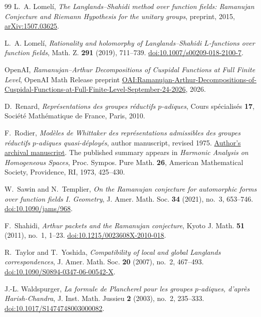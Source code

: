 \begin{thebibliography}{99}
L.~A. Lomel\'i,
\emph{The Langlands--Shahidi method over function fields:
Ramanujan Conjecture and Riemann Hypothesis for the unitary groups},
preprint, 2015, \href{https://arxiv.org/abs/1507.03625}{arXiv:1507.03625}.

L.~A. Lomel\'i,
\emph{Rationality and holomorphy of Langlands--Shahidi $L$-functions
over function fields},
Math. Z. \textbf{291} (2019), 711--739.
\href{https://doi.org/10.1007/s00209-018-2100-7}{doi:10.1007/s00209-018-2100-7}.

OpenAI,
\emph{Ramanujan--Arthur Decompositions of Cuspidal Functions at Full Finite Level},
OpenAI Math Release preprint
\href{https://github.com/openai/math/blob/main/preprints/Ramanujan-Arthur-Decompositions-of-Cuspidal-Functions-at-Full-Finite-Level-September-24-2026/paper.pdf}{OAI:Ramanujan-Arthur-Decompositions-of-Cuspidal-Functions-at-Full-Finite-Level-September-24-2026},
2026.

D.~Renard,
\emph{Repr\'esentations des groupes r\'eductifs $p$-adiques},
Cours sp\'ecialis\'es \textbf{17}, Soci\'et\'e Math\'ematique de France,
Paris, 2010.

F.~Rodier,
\emph{Mod\`eles de Whittaker des repr\'esentations admissibles
des groupes r\'eductifs $p$-adiques quasi-d\'eploy\'es},
author manuscript, revised 1975.
\href{https://www.normalesup.org/~rodier/Whittaker.pdf}{Author's archival manuscript}.
The published summary appears in \emph{Harmonic Analysis on Homogeneous Spaces},
Proc. Sympos. Pure Math. \textbf{26}, American Mathematical Society,
Providence, RI, 1973, 425--430.

W.~Sawin and N.~Templier,
\emph{On the Ramanujan conjecture for automorphic forms over function
fields I. Geometry},
J. Amer. Math. Soc. \textbf{34} (2021), no.~3, 653--746.
\href{https://doi.org/10.1090/jams/968}{doi:10.1090/jams/968}.

F.~Shahidi,
\emph{Arthur packets and the Ramanujan conjecture},
Kyoto J. Math. \textbf{51} (2011), no.~1, 1--23.
\href{https://doi.org/10.1215/0023608X-2010-018}{doi:10.1215/0023608X-2010-018}.

R.~Taylor and T.~Yoshida,
\emph{Compatibility of local and global Langlands correspondences},
J. Amer. Math. Soc. \textbf{20} (2007), no.~2, 467--493.
\href{https://doi.org/10.1090/S0894-0347-06-00542-X}{doi:10.1090/S0894-0347-06-00542-X}.

J.-L. Waldspurger,
\emph{La formule de Plancherel pour les groupes $p$-adiques,
d'apr\`es Harish-Chandra},
J. Inst. Math. Jussieu \textbf{2} (2003), no.~2, 235--333.
\href{https://doi.org/10.1017/S1474748003000082}{doi:10.1017/S1474748003000082}.

\end{thebibliography}
